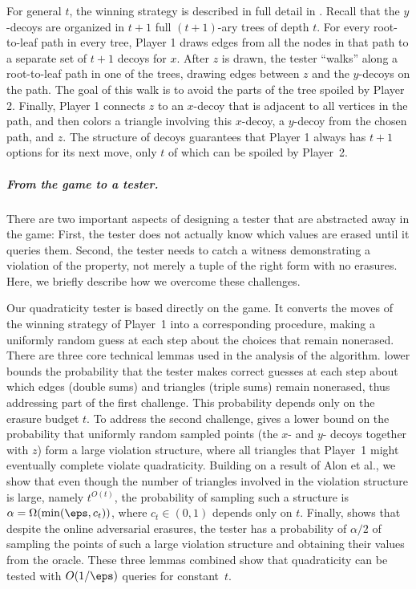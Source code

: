 \documentclass{toc}
\begin{document}
For general $t$, the winning strategy is described in full detail in . Recall that the $y$-decoys are organized in $t+1$ full $(t+1)$-ary trees of depth $t$. For every root-to-leaf path in every tree, Player 1 draws edges from all the nodes in that path to a separate set of $t+1$ decoys for $x$. After $z$ is drawn, the tester ``walks'' along a root-to-leaf path in one of the trees, drawing edges between $z$ and the $y$-decoys on the path. The goal of this walk is to avoid the parts of the tree spoiled by Player 2. Finally, Player 1 connects $z$ to an $x$-decoy that is adjacent to all vertices in the path, and then colors a triangle involving this $x$-decoy, a $y$-decoy from the chosen path, and $z$. The structure of decoys guarantees that Player 1 always has $t+1$ options for its next move, only $t$ of which can be spoiled by Player~2.


\subparagraph*{From the game to a tester.}
There are two important aspects of designing a tester that are abstracted away in the game: First, the tester does not actually know which values are erased until it queries them. Second, the tester needs to catch a witness demonstrating a violation of the property, not merely a tuple of the right form with no erasures. Here, we briefly describe how we overcome these challenges.


  Our quadraticity tester is based directly on the game. It converts the moves of the winning strategy of Player~1 into a corresponding procedure, making a uniformly random guess at each step about the choices that remain nonerased. There are three core technical lemmas used in the analysis of the algorithm.  lower bounds the probability that the tester makes correct guesses at each step about which edges (double sums) and triangles (triple sums) remain nonerased, thus addressing part of the first challenge. This probability depends only on the erasure budget $t$. To address the second challenge,  gives a lower bound on the probability that uniformly random sampled points (the $x$- and $y$- decoys together with $z$) form a large violation structure, where all triangles that Player~1 might eventually complete violate quadraticity. Building on a result of Alon et al., we show that even though the number of triangles involved in the violation structure is large, namely $ t^{O(t)}$, the probability of sampling such a structure is $\alpha = \Omega(\min(\eps, c_t))$, where $c_t \in(0,1)$ depends only on $t$. Finally,  shows that despite the online adversarial erasures, the tester has a probability of $\alpha/2$ of sampling the points of such a large violation structure and obtaining their values from the oracle. These three lemmas combined show that quadraticity can be tested with $O(1/\eps)$ queries for constant~$t$.   
\end{document}
